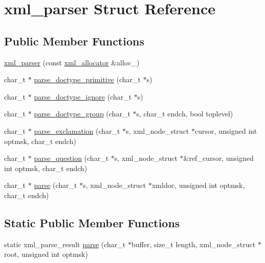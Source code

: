 \hypertarget{structxml__parser}{\section{xml\-\_\-parser Struct Reference}
\label{structxml__parser}
}
\subsection*{Public Member Functions}
\begin{DoxyCompactItemize}
\item 
\hyperlink{structxml__parser_acc030c4ed339b238e1ff2d3e6fa7188b}{xml\-\_\-parser} (const \hyperlink{structxml__allocator}{xml\-\_\-allocator} \&alloc\-\_\-)
\item 
char\-\_\-t $\ast$ \hyperlink{structxml__parser_a722853b603ad9a1d1f61bb8115bea5b4}{parse\-\_\-doctype\-\_\-primitive} (char\-\_\-t $\ast$s)
\item 
char\-\_\-t $\ast$ \hyperlink{structxml__parser_a1e996ac9c9993f1939128859596376a1}{parse\-\_\-doctype\-\_\-ignore} (char\-\_\-t $\ast$s)
\item 
char\-\_\-t $\ast$ \hyperlink{structxml__parser_a9bc0e5f3d75cd7edb267a85430e1cdfc}{parse\-\_\-doctype\-\_\-group} (char\-\_\-t $\ast$s, char\-\_\-t endch, bool toplevel)
\item 
char\-\_\-t $\ast$ \hyperlink{structxml__parser_a40da52e4b27a0a06752930a0edf16fe9}{parse\-\_\-exclamation} (char\-\_\-t $\ast$s, xml\-\_\-node\-\_\-struct $\ast$cursor, unsigned int optmsk, char\-\_\-t endch)
\item 
char\-\_\-t $\ast$ \hyperlink{structxml__parser_a2b0edc4fbf2ff448b4d5b31593c5c4fd}{parse\-\_\-question} (char\-\_\-t $\ast$s, xml\-\_\-node\-\_\-struct $\ast$\&ref\-\_\-cursor, unsigned int optmsk, char\-\_\-t endch)
\item 
char\-\_\-t $\ast$ \hyperlink{structxml__parser_a00626800a3d535c14273c48238c03a70}{parse} (char\-\_\-t $\ast$s, xml\-\_\-node\-\_\-struct $\ast$xmldoc, unsigned int optmsk, char\-\_\-t endch)
\end{DoxyCompactItemize}
\subsection*{Static Public Member Functions}
\begin{DoxyCompactItemize}
\item 
static xml\-\_\-parse\-\_\-result \hyperlink{structxml__parser_a116885dc8aaf5fcd025511def4605674}{parse} (char\-\_\-t $\ast$buffer, size\-\_\-t length, xml\-\_\-node\-\_\-struct $\ast$root, unsigned int optmsk)
\end{DoxyCompactItemize}
